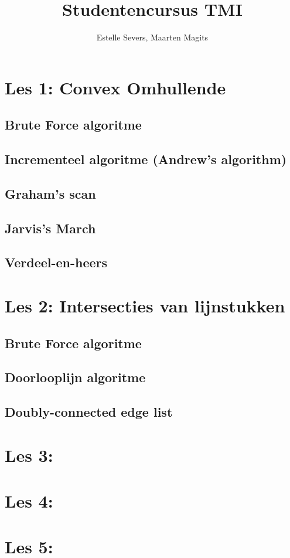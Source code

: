 \documentclass[12pt,a4paper]{article}
\author{Estelle Severs, Maarten Magits}
\title{Studentencursus TMI}
\begin{document}
	\maketitle
	\section{Les 1: Convex Omhullende}
	\subsection{Brute Force algoritme}
	\subsection{Incrementeel algoritme 	(Andrew's algorithm)}
	\subsection{Graham's scan}
	\subsection{Jarvis's March}
	\subsection{Verdeel-en-heers}
	\section{Les 2: Intersecties van lijnstukken}
	\subsection{Brute Force algoritme}
	\subsection{Doorlooplijn algoritme}
	\subsection{Doubly-connected edge 	list}
	\section{Les 3: }
	\section{Les 4: }
	\section{Les 5: }
\end{document}
